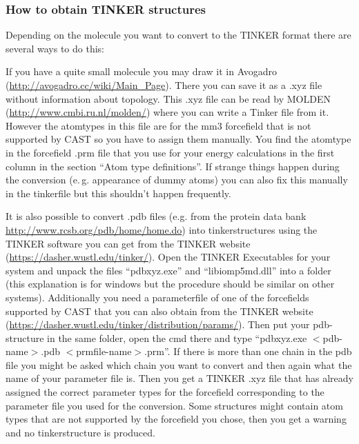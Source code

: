 \documentclass[10pt,a4paper]{article} %
\begin{document}
	\subsubsection{How to obtain TINKER structures} \label{sec:tinker}
	
	Depending on the molecule you want to convert to the TINKER format there are several ways to do this:
	
	If you have a quite small molecule you may draw it in Avogadro (\url{http://avogadro.cc/wiki/Main_Page}). There you can save it as a .xyz file without information about topology. This .xyz file can be read by MOLDEN (\url{http://www.cmbi.ru.nl/molden/}) where you can write a Tinker file from it. However the atomtypes in this file are for the mm3 forcefield that is not supported by \ac{CAST} so you have to assign them manually. You find the atomtype in the forcefield .prm file that you use for your energy calculations in the first column in the section ``Atom type definitions''. If strange things happen during the conversion (e.\,g. appearance of dummy atoms) you can also fix this manually in the tinkerfile but this shouldn't happen frequently.
	
	It is also possible to convert .pdb files (e.g. from the protein data bank \url{http://www.rcsb.org/pdb/home/home.do}) into tinkerstructures using the TINKER software you can get from the TINKER website (\url{https://dasher.wustl.edu/tinker/}). Open the TINKER Executables for your system and unpack the files ``pdbxyz.exe'' and ``libiomp5md.dll'' into a folder (this explanation is for windows but the procedure should be similar on other systems). Additionally you need a parameterfile of one of the forcefields supported by \ac{CAST} that you can also obtain from the TINKER website (\url{https://dasher.wustl.edu/tinker/distribution/params/}). Then put your pdb-structure in the same folder, open the cmd there and type ``pdbxyz.exe $<$pdb-name$>$.pdb $<$prmfile-name$>$.prm''. If there is more than one chain in the pdb file you might be asked which chain you want to convert and then again what the name of your parameter file is. Then you get a TINKER .xyz file that has already assigned the correct parameter types for the forcefield corresponding to the parameter file you used for the conversion. Some structures might contain atom types that are not supported by the forcefield you chose, then you get a warning and no tinkerstructure is produced.
	
\end{document}
